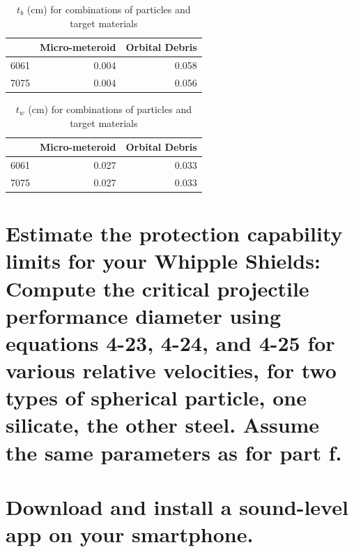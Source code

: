 \documentclass[onecolumn,10pt]{jhwhw}
\begin{document}
\begin{table}[h]
\begin{center}
\begin{tabular}{r|rr}
\toprule
      &   Micro-meteroid &   Orbital Debris \\
\midrule
 6061 &            0.004 &            0.058 \\
 7075 &            0.004 &            0.056 \\
\bottomrule
\end{tabular}
\end{center}
\caption{$t_b$ (cm) for combinations of particles and target materials}
\end{table}

\begin{table}[h]
\begin{center}
\begin{tabular}{r|rr}
\toprule
      &   Micro-meteroid &   Orbital Debris \\
\midrule
 6061 &            0.027 &            0.033 \\
 7075 &            0.027 &            0.033 \\
\bottomrule
\end{tabular}
\end{center}
\caption{$t_w$ (cm) for combinations of particles and target materials}
\end{table}

\part{Estimate the protection capability limits for your Whipple Shields: Compute the critical projectile performance diameter using equations 4-23, 4-24, and 4-25 for various relative velocities, for two types of spherical particle, one silicate, the other steel. Assume the same parameters as for part f.}

\part{Download and install a sound-level app on your smartphone.}
\end{document}
